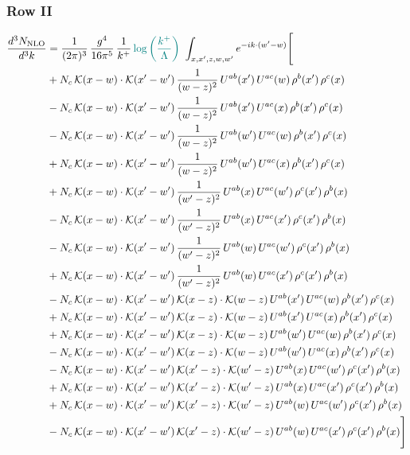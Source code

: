 \documentclass[9pt]{article}
\numberwithin{equation}{section}
\begin{document}
\subsubsection{Row II}
\begin{align}
\frac{d^3N_{\rm NLO}}{d^3k} & =  \frac{1}{(2\pi)^{3}}\,\frac{g^{4}}{16\pi^{5}}\,\frac{1}{k^{+}}\,{\color{teal}\log{\left(\frac{k^{+}}{\Lambda}\right)}}\,\, \int_{x,x',z,w,w'}e^{-ik\cdot(w'-w)}\Bigg[\notag\\
&+N_{c}\,\mathcal{K}(x-w)\cdot\mathcal{K}(x'-w')\,\frac{1}{(w-z)^{2}}\,U^{ab}(x')\,U^{ac}(w)\,\rho^{b}(x')\,\rho^{c}(x)\notag\\
&-N_{c}\,\mathcal{K}(x-w)\cdot\mathcal{K}(x'-w')\,\frac{1}{(w-z)^{2}}\,U^{ab}(x')\,U^{ac}(x)\,\rho^{b}(x')\,\rho^{c}(x)\notag\\
&-N_{c}\,\mathcal{K}(x-w)\cdot\mathcal{K}(x'-w')\,\frac{1}{(w-z)^{2}}\,U^{ab}(w')\,U^{ac}(w)\,\rho^{b}(x')\,\rho^{c}(x)\notag\\
&+N_{c}\,\mathcal{K}(x-w)\cdot\mathcal{K}(x'-w')\,\frac{1}{(w-z)^{2}}\,U^{ab}(w')\,U^{ac}(x)\,\rho^{b}(x')\,\rho^{c}(x)\notag\\
&+N_{c}\,\mathcal{K}(x-w)\cdot\mathcal{K}(x'-w')\,\frac{1}{(w'-z)^{2}}\,U^{ab}(x)\,U^{ac}(w')\,\rho^{c}(x')\,\rho^{b}(x)\notag\\
&-N_{c}\,\mathcal{K}(x-w)\cdot\mathcal{K}(x'-w')\,\frac{1}{(w'-z)^{2}}\,U^{ab}(x)\,U^{ac}(x')\,\rho^{c}(x')\,\rho^{b}(x)\notag\\
&-N_{c}\,\mathcal{K}(x-w)\cdot\mathcal{K}(x'-w')\,\frac{1}{(w'-z)^{2}}\,U^{ab}(w)\,U^{ac}(w')\,\rho^{c}(x')\,\rho^{b}(x)\notag\\
&+N_{c}\,\mathcal{K}(x-w)\cdot\mathcal{K}(x'-w')\,\frac{1}{(w'-z)^{2}}\,U^{ab}(w)\,U^{ac}(x')\,\rho^{c}(x')\,\rho^{b}(x)\notag\\
&-N_{c}\,\mathcal{K}(x-w)\cdot\mathcal{K}(x'-w')\,\mathcal{K}(x-z)\cdot\mathcal{K}(w-z)\,U^{ab}(x')\,U^{ac}(w)\,\rho^{b}(x')\,\rho^{c}(x)\notag\\
&+N_{c}\,\mathcal{K}(x-w)\cdot\mathcal{K}(x'-w')\,\mathcal{K}(x-z)\cdot\mathcal{K}(w-z)\,U^{ab}(x')\,U^{ac}(x)\,\rho^{b}(x')\,\rho^{c}(x)\notag\\
&+N_{c}\,\mathcal{K}(x-w)\cdot\mathcal{K}(x'-w')\,\mathcal{K}(x-z)\cdot\mathcal{K}(w-z)\,U^{ab}(w')\,U^{ac}(w)\,\rho^{b}(x')\,\rho^{c}(x)\notag\\
&-N_{c}\,\mathcal{K}(x-w)\cdot\mathcal{K}(x'-w')\,\mathcal{K}(x-z)\cdot\mathcal{K}(w-z)\,U^{ab}(w')\,U^{ac}(x)\,\rho^{b}(x')\,\rho^{c}(x)\notag\\
&-N_{c}\,\mathcal{K}(x-w)\cdot\mathcal{K}(x'-w')\,\mathcal{K}(x'-z)\cdot\mathcal{K}(w'-z)\,U^{ab}(x)\,U^{ac}(w')\,\rho^{c}(x')\,\rho^{b}(x)\notag\\
&+N_{c}\,\mathcal{K}(x-w)\cdot\mathcal{K}(x'-w')\,\mathcal{K}(x'-z)\cdot\mathcal{K}(w'-z)\,U^{ab}(x)\,U^{ac}(x')\,\rho^{c}(x')\,\rho^{b}(x)\notag\\
&+N_{c}\,\mathcal{K}(x-w)\cdot\mathcal{K}(x'-w')\,\mathcal{K}(x'-z)\cdot\mathcal{K}(w'-z)\,U^{ab}(w)\,U^{ac}(w')\,\rho^{c}(x')\,\rho^{b}(x)\notag\\
&-N_{c}\,\mathcal{K}(x-w)\cdot\mathcal{K}(x'-w')\,\mathcal{K}(x'-z)\cdot\mathcal{K}(w'-z)\,U^{ab}(w)\,U^{ac}(x')\,\rho^{c}(x')\,\rho^{b}(x)\Bigg]
\end{align}
\end{document}
